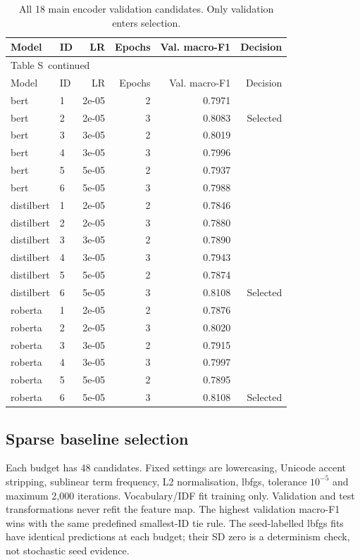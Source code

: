 \documentclass[10pt,a4paper]{article}
\renewcommand{\thetable}{S\arabic{table}}
\begin{document}
{\small
\setlength{\tabcolsep}{4pt}
\begin{longtable}{@{}llrrrr@{}}
\caption{All 18 main encoder validation candidates. Only validation enters selection.}\label{sup:encoder-search}\\
\toprule
Model & ID & LR & Epochs & Val. macro-F1 & Decision \\
\midrule\endfirsthead
\multicolumn{6}{l}{\small Table \thetable\ continued}\\
\toprule
Model & ID & LR & Epochs & Val. macro-F1 & Decision \\
\midrule\endhead
\bottomrule\endfoot
bert & 1 & 2e-05 & 2 & 0.7971 &  \\
bert & 2 & 2e-05 & 3 & 0.8083 & Selected \\
bert & 3 & 3e-05 & 2 & 0.8019 &  \\
bert & 4 & 3e-05 & 3 & 0.7996 &  \\
bert & 5 & 5e-05 & 2 & 0.7937 &  \\
bert & 6 & 5e-05 & 3 & 0.7988 &  \\
distilbert & 1 & 2e-05 & 2 & 0.7846 &  \\
distilbert & 2 & 2e-05 & 3 & 0.7880 &  \\
distilbert & 3 & 3e-05 & 2 & 0.7890 &  \\
distilbert & 4 & 3e-05 & 3 & 0.7943 &  \\
distilbert & 5 & 5e-05 & 2 & 0.7874 &  \\
distilbert & 6 & 5e-05 & 3 & 0.8108 & Selected \\
roberta & 1 & 2e-05 & 2 & 0.7876 &  \\
roberta & 2 & 2e-05 & 3 & 0.8020 &  \\
roberta & 3 & 3e-05 & 2 & 0.7915 &  \\
roberta & 4 & 3e-05 & 3 & 0.7997 &  \\
roberta & 5 & 5e-05 & 2 & 0.7895 &  \\
roberta & 6 & 5e-05 & 3 & 0.8108 & Selected \\
\end{longtable}
}

\subsection{Sparse baseline selection}
Each budget has 48 candidates. Fixed settings are lowercasing, Unicode accent stripping, sublinear term frequency, L2 normalisation, lbfgs, tolerance $10^{-5}$ and maximum 2,000 iterations. Vocabulary/IDF fit training only. Validation and test transformations never refit the feature map. The highest validation macro-F1 wins with the same predefined smallest-ID tie rule. The seed-labelled lbfgs fits have identical predictions at each budget; their SD zero is a determinism check, not stochastic seed evidence.
\end{document}
